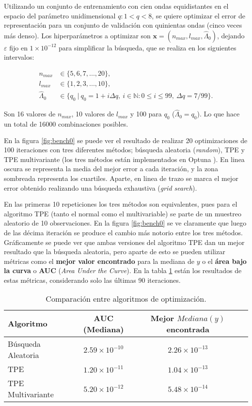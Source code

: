 Utilizando un conjunto de entrenamiento con cien ondas equidistantes en el espacio del parámetro unidimensional $q: 1 < q < 8$, se quiere optimizar el error de representación para un conjunto de validación con quinientas ondas (cinco veces más denso). Los hiperparámetros a optimizar son $\textbf{x} = (n_{max}, l_{max}, \hat{\Lambda}_0)$, dejando $\varepsilon$ fijo en $1\times 10^{-12}$ para simplificar la búsqueda, que se realiza en los siguientes intervalos:

\begin{align*}
n_{max} &\in \{5, 6, 7, ..., 20\},\\
l_{max} &\in \{1, 2, 3, ..., 10 \},\\
\hat{\Lambda}_0 &\in \{q_0 \ | \ q_0 = 1 + i \Delta q, \ i\in \mathbb{N} : 0 \le i \le 99, \ \Delta q = 7/99 \}.
\end{align*}

Son 16 valores de $n_{max}$, 10 valores de $l_{max}$ y 100 para $q_0$ ($\hat{\Lambda}_0 = q_0$). Lo que hace un total de 16000 combinaciones posibles.

En la figura \ref{fig:bench0} se puede ver el resultado de realizar 20 optimizaciones de 100 iteraciones con tres diferentes métodos; búsqueda aleatoria (\textit{random}), TPE y TPE multivariante (los tres métodos están implementados en Optuna \cite{optuna_2019}). En linea oscura se representa la media del mejor error a cada iteración, y la zona sombreada representa los cuartiles. Aparte, en linea de trazo se marca el mejor error obtenido realizando una búsqueda exhaustiva (\textit{grid search}).


En las primeras 10 repeticiones los tres métodos son equivalentes, pues para el algoritmo TPE (tanto el normal como el multivariable) se parte de un muestreo aleatorio de 10 observaciones. En la figura \ref{fig:bench0} se ve claramente que luego de las décima iteración se produce el cambio más notorio entre los tres métodos. Gráficamente se puede ver que ambas versiones del algoritmo TPE dan un mejor resultado que la búsqueda aleatoria, pero aparte de esto se pueden utilizar métricas como el \textbf{mejor valor encontrado} para la mediana de $y$ o el \textbf{área bajo la curva} o \textbf{AUC} (\textit{Area Under the Curve})\cite{Dewancker2016ASF}. En la tabla \ref{tab:comp1} están los resultados de estas métricas, considerando solo las últimas 90 iteraciones.


\begin{table}
\centering
\begin{tabular}{@{}lccc@{}}
\toprule
\textbf{Algoritmo} & AUC (Mediana) & Mejor $Mediana(y)$ encontrada \\ 
\midrule
Búsqueda Aleatoria & $2.59\times 10^{-10}$ & $2.26\times 10^{-13}$ \\ 
TPE & $1.20\times 10^{-11}$ & $1.04\times 10^{-13}$ \\ 
TPE Multivariante & $5.20\times 10^{-12}$ & $5.48\times 10^{-14}$ \\ 
\bottomrule
\end{tabular} 
\caption{Comparación entre algoritmos de optimización.}
\label{tab:comp1}
\end{table}

